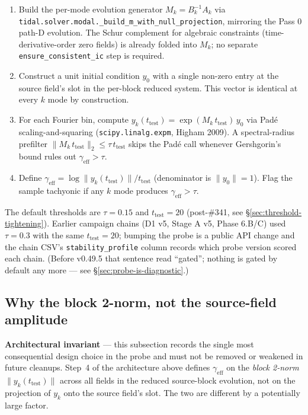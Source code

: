\begin{enumerate}
\item Build the per-mode evolution generator
$M_k = B_k^{-1} A_k$ via
\texttt{tidal.solver.modal.\_build\_m\_with\_null\_projection},
mirroring the Pass 0 path-D evolution. The Schur complement for
algebraic constraints (time-derivative-order zero fields) is already
folded into $M_k$; no separate
\texttt{ensure\_consistent\_ic} step is required.
\item Construct a unit initial condition $y_0$ with a single
non-zero entry at the source field's slot in the per-block reduced
system. This vector is identical at every $k$ mode by
construction.
\item For each Fourier bin, compute
$y_k(t_{\text{test}}) = \exp(M_k\, t_{\text{test}})\, y_0$ via
Pad\'e scaling-and-squaring (\texttt{scipy.linalg.expm}, Higham 2009).
A spectral-radius prefilter
$\| M_k\, t_{\text{test}} \|_2 \le \tau\, t_{\text{test}}$ skips the
Pad\'e call whenever Gershgorin's bound rules out
$\gamma_{\text{eff}} > \tau$.
\item Define $\gamma_{\text{eff}} = \log \| y_k(t_{\text{test}}) \|
/ t_{\text{test}}$ (denominator is $\| y_0 \| = 1$). Flag the sample
tachyonic if any $k$ mode produces $\gamma_{\text{eff}} > \tau$.
\end{enumerate}

The default thresholds are $\tau = 0.15$ and $t_{\text{test}} = 20$
(post-\#341, see \S\ref{sec:threshold-tightening}). Earlier
campaign chains (D1 v5, Stage A v5, Phase 6.B/C) used $\tau = 0.3$
with the same $t_{\text{test}} = 20$; bumping the probe is a public
API change and the chain CSV's
\texttt{stability\_profile} column records which probe version
scored each chain.  (Before v0.49.5 that sentence read ``gated'';
nothing is gated by default any more --- see
\S\ref{sec:probe-is-diagnostic}.)

\subsection{Why the block 2-norm, not the source-field amplitude}
\label{sec:block-norm-not-source}

\textbf{Architectural invariant} --- this subsection records the single
most consequential design choice in the probe and must not be removed
or weakened in future cleanups. Step~4 of the architecture above
defines $\gamma_{\text{eff}}$ on the \emph{block 2-norm}
$\| y_k(t_{\text{test}}) \|$ across all fields in the reduced
source-block evolution, not on the projection of $y_k$ onto the source
field's slot. The two are different by a potentially large factor.

